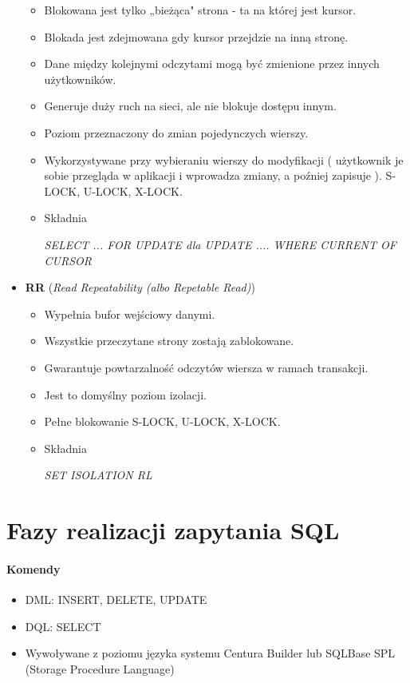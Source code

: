 \documentclass[a4paper,twoside]{article}
\begin{document}
\begin{itemize}
\begin{itemize}
  			\item Blokowana jest tylko „bieżąca" strona - ta na której jest kursor.
  			\item Blokada jest zdejmowana gdy kursor przejdzie na inną stronę.
  			\item Dane między kolejnymi odczytami mogą być zmienione przez innych użytkowników.               \item Generuje duży ruch na sieci, ale nie blokuje dostępu innym.
  			\item Poziom przeznaczony do zmian pojedynczych wierszy.
  			\item Wykorzystywane przy wybieraniu wierszy do modyfikacji ( użytkownik je sobie przegląda w aplikacji i wprowadza zmiany, a poźniej zapisuje ). S-LOCK, U-LOCK, X-LOCK.
  			\item Składnia\\
  			\centerline{\emph{SELECT ... FOR UPDATE dla UPDATE .... WHERE CURRENT OF CURSOR}}
  		\end{itemize}
  		\item \textbf{RR} (\emph{Read Repeatability (albo Repetable Read)})
  		\begin{itemize}
  			\item Wypełnia bufor wejściowy danymi.
  			\item Wszystkie przeczytane strony zostają zablokowane.
  			\item Gwarantuje powtarzalność odczytów wiersza w ramach transakcji.
  			\item Jest to domyślny poziom izolacji.
  			\item Pełne blokowanie S-LOCK, U-LOCK, X-LOCK.
  			\item Składnia\\
  			\centerline{\emph{SET ISOLATION RL}}
  		\end{itemize}
  	\end{itemize}
  	
  	
  	\part*{Fazy realizacji zapytania SQL}
  	\subsection*{Komendy}
  	\begin{itemize}
  		\item DML: INSERT, DELETE, UPDATE
  		\item DQL: SELECT
  		\item Wywoływane  z poziomu języka systemu Centura Builder lub SQLBase SPL (Storage Procedure Language)
  	\end{itemize}
\end{document}
